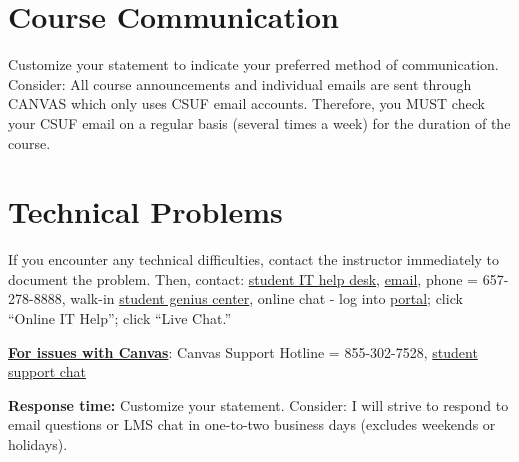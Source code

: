 \documentclass[12pt]{article}
\begin{document}

\section*{Course Communication}

{\color{annotationblue}Customize your statement to indicate your preferred method of communication.} {\color{suggestionred}Consider: All course announcements and individual emails are sent through CANVAS which only uses CSUF email accounts. Therefore, you MUST check your CSUF email on a regular basis (several times a week) for the duration of the course.}

\section*{Technical Problems}

{\color{suggestionred}If you encounter any technical difficulties, contact the instructor immediately to document the problem. Then, contact: \href{http://www.fullerton.edu/it/students/helpdesk/index.php}{student IT help desk}, \href{mailto:StudentITHelpDesk@fullerton.edu}{email}, phone = 657-278-8888, walk-in \href{http://www.fullerton.edu/it/students/sgc/index.php}{student genius center}, online chat - log into \href{http://my.fullerton.edu}{portal}; click ``Online IT Help''; click ``Live Chat.''}

\vspace{0.5em}

\noindent \textbf{\underline{For issues with Canvas}}: {\color{suggestionred}Canvas Support Hotline = 855-302-7528, \href{https://cases.canvaslms.com/liveagentchat?chattype=student&sfid=001A000000YzcwQIAR}{student support chat}}

\vspace{0.5em}


\vspace{0.5em}

\noindent \textbf{Response time:} {\color{annotationblue}Customize your statement.} {\color{suggestionred}Consider: I will strive to respond to email questions or LMS chat in one-to-two business days (excludes weekends or holidays).}
\end{document}
